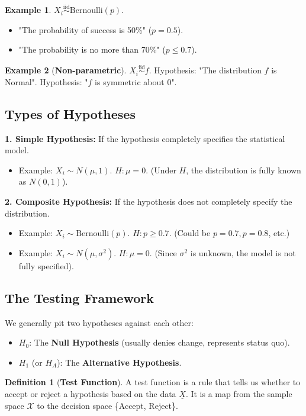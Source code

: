 \documentclass[12pt, a4paper]{article}
\theoremstyle{definition}
\newtheorem{definition}{Definition}
\newtheorem{example}{Example}
\newcommand{\iid}{\overset{\text{iid}}{\sim}}
\newcommand{\Xvec}{\underline{X}}
\begin{document}
\begin{example}
$X_i \iid \text{Bernoulli}(p)$.
\begin{itemize}
    \item "The probability of success is 50\%" ($p=0.5$).
    \item "The probability is no more than 70\%" ($p \le 0.7$).
\end{itemize}
\end{example}

\begin{example}[\textbf{Non-parametric}]
$X_i \iid f$.
Hypothesis: "The distribution $f$ is Normal".
Hypothesis: "$f$ is symmetric about 0".
\end{example}

\subsection{Types of Hypotheses}

\textbf{1. Simple Hypothesis:}
If the hypothesis completely specifies the statistical model.
\begin{itemize}
    \item Example: $X_i \sim N(\mu, 1)$. $H: \mu = 0$. (Under $H$, the distribution is fully known as $N(0,1)$).
\end{itemize}

\textbf{2. Composite Hypothesis:}
If the hypothesis does not completely specify the distribution.
\begin{itemize}
    \item Example: $X_i \sim \text{Bernoulli}(p)$. $H: p \ge 0.7$. (Could be $p=0.7, p=0.8$, etc.)
    \item Example: $X_i \sim N(\mu, \sigma^2)$. $H: \mu = 0$. (Since $\sigma^2$ is unknown, the model is not fully specified).
\end{itemize}

\subsection{The Testing Framework}
We generally pit two hypotheses against each other:
\begin{itemize}
    \item $H_0$: The \textbf{Null Hypothesis} (usually denies change, represents status quo).
    \item $H_1$ (or $H_A$): The \textbf{Alternative Hypothesis}.
\end{itemize}

\begin{definition}[\textbf{Test Function}]
A test function is a rule that tells us whether to accept or reject a hypothesis based on the data $\Xvec$.
It is a map from the sample space $\mathcal{X}$ to the decision space \{Accept, Reject\}.
\end{definition}
\end{document}
